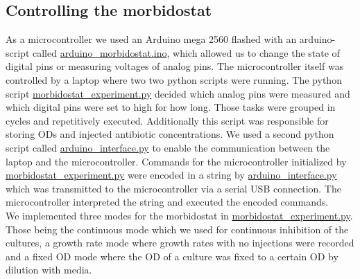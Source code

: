 \subsection{Controlling the morbidostat}
As a microcontroller we used an Arduino mega 2560 flashed with an arduino-script called \href{https://github.com/nahanoo/ESBL\_project/}{arduino\_morbidostat.ino}, which allowed us to change the state of digital pins or measuring voltages of analog pins. The microcontroller itself was controlled by a laptop where two two python scripts were running. The python script \href{https://github.com/nahanoo/ESBL\_project/}{morbidostat\_experiment.py} decided which analog pins were measured and which digital pins were set to high for how long. Those tasks were grouped in cycles and repetitively executed. Additionally this script was responsible for storing ODs and injected antibiotic concentrations. We used a second python script called \href{https://github.com/nahanoo/ESBL\_project/}{arduino\_interface.py} to enable the communication between the laptop and the microcontroller. Commands for the microcontroller initialized by \href{https://github.com/nahanoo/ESBL\_project/}{morbidostat\_experiment.py} were encoded in a string by \href{https://github.com/nahanoo/ESBL\_project/}{arduino\_interface.py} which was transmitted to the microcontroller via a serial USB connection. The microcontroller interpreted the string and executed the encoded commands. \\
We implemented three modes for the morbidostat in \href{https://github.com/nahanoo/ESBL\_project/}{morbidostat\_experiment.py}. Those being the continuous mode which we used for continuous inhibition of the cultures, a growth rate mode where growth rates with no injections were recorded and a fixed OD mode where the OD of a culture was fixed to a certain OD by dilution with media. \\   


